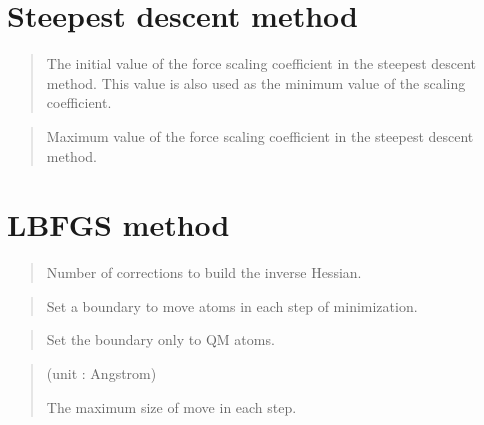 \documentclass[a4paper,11pt,oneside,english]{sphinxmanual}
\begin{document}
\section{Steepest descent method}
\label{\detokenize{07_Minimize:steepest-descent-method}}
 
\begin{quote}


The initial value of the force scaling coefficient in the steepest descent method.
This value is also used as the minimum value of the scaling coefficient.
\end{quote}

 
\begin{quote}


Maximum value of the force scaling coefficient in the steepest
descent method.
\end{quote}


\section{LBFGS method}
\label{\detokenize{07_Minimize:lbfgs-method}}
 
\begin{quote}


Number of corrections to build the inverse Hessian.
\end{quote}

 
\begin{quote}


Set a boundary to move atoms in each step of minimization.
\end{quote}

 
\begin{quote}


Set the boundary only to QM atoms.
\end{quote}

 
\begin{quote}

 (unit : Angstrom)

The maximum size of move in each step.
\end{quote}
\end{document}
